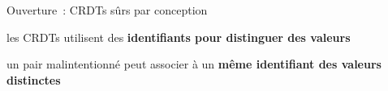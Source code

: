 \begin{frame}{Ouverture~: CRDTs sûrs par conception}
\begin{minipage}[c][.6\textheight][t]{\textwidth}
    \end{minipage}
    \begin{minipage}{\textwidth}
        \begin{compactitemize}
            \item les CRDTs utilisent des \textbf{identifiants pour distinguer des valeurs}
            \item un pair malintentionné peut associer à un \textbf{même identifiant des valeurs distinctes}
        \end{compactitemize}
    \end{minipage}
\end{frame}


